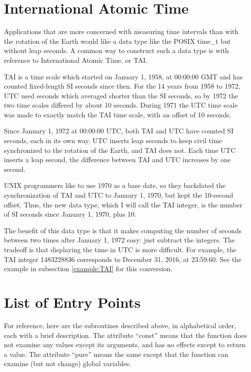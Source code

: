 \documentclass[letterpaper,twoside]{article}
\begin{document}
\section{International Atomic Time}
\label{section:International Atomic Time}
Applications that are more concerned with measuring time intervals than
with the rotation of the Earth would like a data type like the POSIX
{\ttfamily time\_t} but without leap seconds.  A common way to construct
such a data type is with reference to International Atomic Time, or TAI.

TAI is a time scale which started on January 1, 1958, at 00:00:00 GMT
and has counted fixed-length SI seconds since then.  For the 14 years from
1958 to 1972, UTC used seconds which averaged shorter than the SI seconds,
so by 1972 the two time scales differed by about 10 seconds.  During 1971 the
UTC time scale was made to exactly match the TAI time scale, with an offset of
10 seconds.

Since January 1, 1972 at 00:00:00 UTC, both TAI and UTC have counted
SI seconds, each in its own way.  UTC inserts leap seconds to keep
civil time synchronized to the rotation of the Earth, and TAI does not.
Each time UTC inserts a leap second, the difference between TAI and UTC
increases by one second.

UNIX programmers like to use 1970 as a base date, so they backdated the
synchronization of TAI and UTC to January 1, 1970, but kept the 10-second
offset.  Thus, the new data type, which I will call the TAI integer,
is the number of SI seconds since January 1, 1970, plus 10.

The benefit of this data type is that it makes computing the number of
seconds between two times after January 1, 1972 easy: just subtract the
integers.  The tradeoff is that displaying the time in UTC is more difficult.
For example, the TAI integer \num{1483228836} corresponds to December 31, 2016,
at 23:59:60.
See the example in subsection \ref{example:TAI} for this conversion.

\section{List of Entry Points}
For reference, here are the subroutines described above, in
alphabetical order, each with a brief description.
The attribute ``const'' means that the function does not examine
any values except its arguments, and has no effects except
to return a value.  The attribute ``pure'' means the same except
that the function can examine (but not change) global variables.
\inputminted[firstline=37,lastline=283]{c}{time_subroutines.h}
\end{document}

